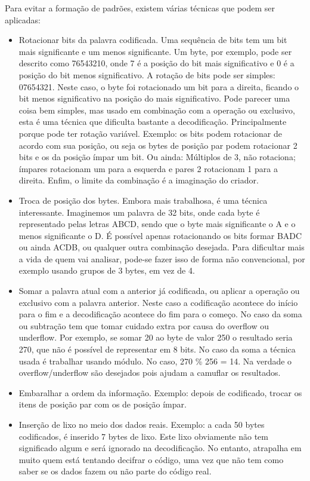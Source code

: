 Para evitar a formação de padrões, existem várias técnicas que podem ser aplicadas:
\begin{itemize}
\item Rotacionar bits da palavra codificada. Uma sequência de bits tem um bit mais significante e um menos significante. Um byte, por exemplo, pode ser descrito como 76543210, onde 7 é a posição do bit mais significativo e 0 é a posição do bit menos significativo. A rotação de bits pode ser simples: 07654321. Neste caso, o byte foi rotacionado um bit para a direita, ficando o bit menos significativo na posição do mais significativo. Pode parecer uma coisa bem simples, mas usado em combinação com a operação ou exclusivo, esta é uma técnica que dificulta bastante a decodificação. Principalmente porque pode ter rotação variável. Exemplo: os bits  podem rotacionar de acordo com sua posição, ou seja os bytes de posição par podem rotacionar 2 bits e os da  posição ímpar um bit. Ou ainda: Múltiplos de 3, não rotaciona; ímpares rotacionam um para a esquerda e pares 2 rotacionam 1 para a direita. Enfim, o limite da combinação é a imaginação do criador. 
\item Troca de posição dos bytes. Embora mais trabalhosa, é uma técnica interessante. Imaginemos um palavra de 32 bits, onde cada byte é representado pelas letras ABCD, sendo que o byte mais significante o A e o menos significante o D. É possível apenas rotacionando os bits formar BADC ou ainda ACDB, ou qualquer outra combinação desejada. Para dificultar mais a vida de quem vai analisar, pode-se fazer isso de forma não convencional, por exemplo usando grupos de 3 bytes, em vez de 4.
\item Somar a palavra atual com a anterior já codificada, ou aplicar a operação ou exclusivo com a palavra anterior. Neste caso a codificação acontece do início para o fim e a decodificação acontece do fim para o começo. No caso da soma ou subtração tem que tomar cuidado extra por causa do overflow ou underflow. Por exemplo, se somar 20 ao byte de valor 250 o resultado seria 270, que não é possível de representar em 8 bits. No caso da soma a técnica usada é trabalhar usando módulo. No caso, 270 \% 256 = 14. Na verdade o overflow/underflow são desejados pois ajudam a camuflar os resultados. 
\item Embaralhar a ordem da informação. Exemplo: depois de codificado, trocar os itens de posição par com os de posição ímpar.
\item Inserção de lixo no meio dos dados reais. Exemplo: a cada 50 bytes codificados, é inserido 7 bytes de lixo. Este lixo obviamente não tem significado algum e será ignorado na decodificação. No entanto, atrapalha em muito quem está tentando decifrar o código, uma vez que não tem como saber se os dados fazem ou não parte do código real.

\end{itemize}
